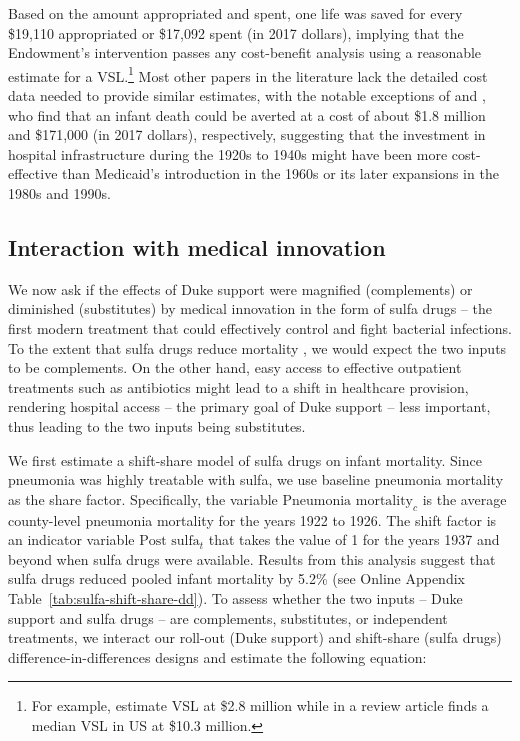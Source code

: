 \documentclass[12pt]{article}
\begin{document}
Based on the amount appropriated and spent, one life was saved for every \$19,110 appropriated or \$17,092 spent (in 2017 dollars), implying that the Endowment's intervention passes any cost-benefit analysis using a reasonable estimate for a VSL.\footnote{For example,  estimate VSL at \$2.8 million while in a review article  finds a median VSL in US at \$10.3 million.} 
Most other papers in the literature lack the detailed cost data needed to provide similar estimates, with the notable exceptions of  and , who find that an infant death could be averted at a cost of about \$1.8 million and \$171,000 (in 2017 dollars), respectively, suggesting that the investment in hospital infrastructure during the 1920s to 1940s might have been more cost-effective than Medicaid's introduction in the 1960s or its later expansions in the 1980s and 1990s. 


\subsection{Interaction with medical innovation}\label{subsec:interactions}

We now ask if the effects of Duke support were magnified (complements) or diminished (substitutes) by medical innovation in the form of sulfa drugs -- the first modern treatment that could effectively control and fight bacterial infections. 
To the extent that sulfa drugs reduce mortality , we would expect the two inputs to be complements.
On the other hand, easy access to effective outpatient treatments such as antibiotics might lead to a shift in healthcare provision, rendering hospital access -- the primary goal of Duke support -- less important, thus leading to the two inputs being substitutes.

We first estimate a shift-share model of sulfa drugs on infant mortality. 
Since pneumonia was highly treatable with sulfa, we use baseline pneumonia mortality as the share factor. 
Specifically, the variable $\text{Pneumonia mortality}_{c}$ is the average county-level pneumonia mortality for the years 1922 to 1926. 
The shift factor is an indicator variable $\text{Post sulfa}_{t}$ that takes the value of 1 for the years 1937 and beyond when sulfa drugs were available. 
Results from this analysis suggest that sulfa drugs reduced pooled infant mortality by 5.2\% (see Online Appendix Table~\ref{tab:sulfa-shift-share-dd}). 
To assess whether the two inputs -- Duke support and sulfa drugs -- are complements, substitutes, or independent treatments, we interact our roll-out (Duke support) and shift-share (sulfa drugs) difference-in-differences designs and estimate the following equation:
\end{document}
